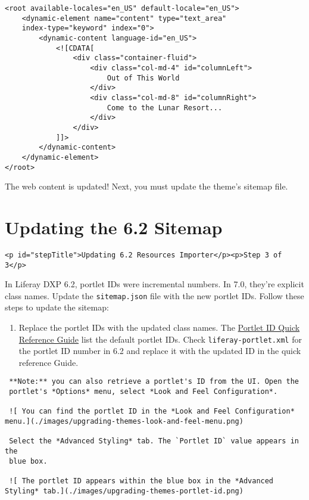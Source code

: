 \begin{enumerate}
\begin{verbatim}
<root available-locales="en_US" default-locale="en_US">
    <dynamic-element name="content" type="text_area"
    index-type="keyword" index="0">
        <dynamic-content language-id="en_US">
            <![CDATA[
                <div class="container-fluid">
                    <div class="col-md-4" id="columnLeft">
                        Out of This World
                    </div>
                    <div class="col-md-8" id="columnRight">
                        Come to the Lunar Resort...
                    </div>
                </div>
            ]]>
        </dynamic-content>
    </dynamic-element>
</root>
\end{verbatim}
\end{enumerate}

The web content is updated! Next, you must update the theme's sitemap
file.

\chapter{Updating the 6.2 Sitemap}\label{updating-the-6.2-sitemap}

\begin{verbatim}
<p id="stepTitle">Updating 6.2 Resources Importer</p><p>Step 3 of 3</p>
\end{verbatim}

In Liferay DXP 6.2, portlet IDs were incremental numbers. In 7.0,
they're explicit class names. Update the \texttt{sitemap.json} file with
the new portlet IDs. Follow these steps to update the sitemap:

\begin{enumerate}
\def\labelenumi{\arabic{enumi}.}
\tightlist
\item
  Replace the portlet IDs with the updated class names. The
  \href{/docs/7-2/reference/-/knowledge_base/r/fully-qualified-portlet-ids}{Portlet
  ID Quick Reference Guide} list the default portlet IDs. Check
  \texttt{liferay-portlet.xml} for the portlet ID number in 6.2 and
  replace it with the updated ID in the quick reference Guide.
\end{enumerate}

\noindent\hrulefill

\begin{verbatim}
 **Note:** you can also retrieve a portlet's ID from the UI. Open the 
 portlet's *Options* menu, select *Look and Feel Configuration*. 
 
 ![ You can find the portlet ID in the *Look and Feel Configuration* menu.](./images/upgrading-themes-look-and-feel-menu.png)
 
 Select the *Advanced Styling* tab. The `Portlet ID` value appears in the 
 blue box. 
 
 ![ The portlet ID appears within the blue box in the *Advanced Styling* tab.](./images/upgrading-themes-portlet-id.png)
\end{verbatim}


